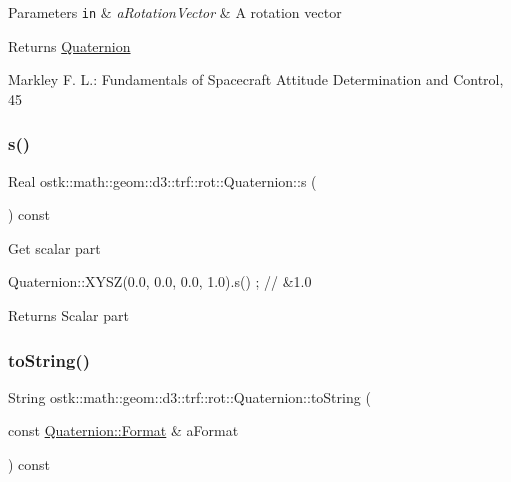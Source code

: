 \begin{DoxyParams}[1]{Parameters}
\mbox{\tt in}  & {\em a\+Rotation\+Vector} & A rotation vector \\
\hline
\end{DoxyParams}
\begin{DoxyReturn}{Returns}
\hyperlink{classostk_1_1math_1_1geom_1_1d3_1_1trf_1_1rot_1_1_quaternion}{Quaternion} 
\end{DoxyReturn}
Markley F. L.\+: Fundamentals of Spacecraft Attitude Determination and Control, 45 \mbox{\label{classostk_1_1math_1_1geom_1_1d3_1_1trf_1_1rot_1_1_quaternion_ab53045f72736712ac53e4def941a196a}} 
\subsubsection{\texorpdfstring{s()}{s()}}
{\footnotesize\ttfamily Real ostk\+::math\+::geom\+::d3\+::trf\+::rot\+::\+Quaternion\+::s (\begin{DoxyParamCaption}{ }\end{DoxyParamCaption}) const}

Get scalar part


\begin{DoxyCode}
Quaternion::XYSZ(0.0, 0.0, 0.0, 1.0).s() ; \textcolor{comment}{// &1.0}
\end{DoxyCode}


\begin{DoxyReturn}{Returns}
Scalar part 
\end{DoxyReturn}
\mbox{\label{classostk_1_1math_1_1geom_1_1d3_1_1trf_1_1rot_1_1_quaternion_a9a9e668493a595ce8186602ae0c38dc2}} 
\subsubsection{\texorpdfstring{to\+String()}{toString()}\hspace{0.1cm}{\footnotesize\ttfamily [1/2]}}
{\footnotesize\ttfamily String ostk\+::math\+::geom\+::d3\+::trf\+::rot\+::\+Quaternion\+::to\+String (\begin{DoxyParamCaption}\item[{const \hyperlink{classostk_1_1math_1_1geom_1_1d3_1_1trf_1_1rot_1_1_quaternion_aa7a75f0dd505a58236ee355959e00bfd}{Quaternion\+::\+Format} \&}]{a\+Format }\end{DoxyParamCaption}) const}



